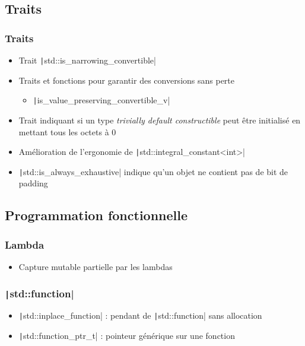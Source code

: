 \documentclass[C++.tex]{subfiles}
\begin{document}
\subsection*{Traits}
\begin{frame}[fragile]
	\frametitle{Traits}
	\begin{itemize}
		\item Trait \texttt|std::is_narrowing_convertible|
		\item Traits et fonctions pour garantir des conversions sans perte
		\begin{itemize}
			\item \texttt|is_value_preserving_convertible_v|
		\end{itemize}
		\item Trait indiquant si un type \textit{trivially default constructible} peut être initialisé en mettant tous les octets à 0
		\item Amélioration de l'ergonomie de \texttt|std::integral_constant<int>|
		\item \texttt|std::is_always_exhaustive| indique qu'un objet ne contient pas de bit de padding
	\end{itemize}

\end{frame}

\subsection*{Programmation fonctionnelle}
\begin{frame}[fragile]
	\frametitle{Lambda}
	\begin{itemize}
		\item Capture mutable partielle par les lambdas
	\end{itemize}
\end{frame}

\begin{frame}[fragile]
	\frametitle{\texttt|std::function|}
	\begin{itemize}
		\item \texttt|std::inplace_function| : pendant de \texttt|std::function| sans allocation
		\item \texttt|std::function_ptr_t| : pointeur générique sur une fonction
	\end{itemize}

\end{frame}
\end{document}
